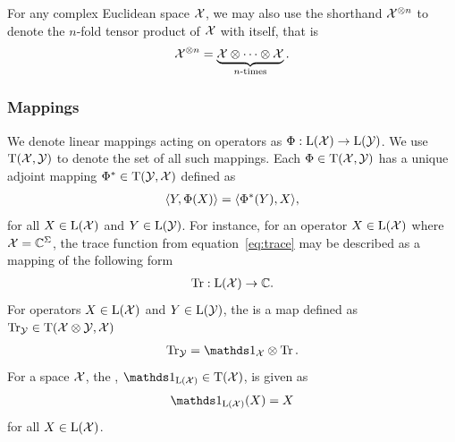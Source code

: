 For any complex Euclidean space $\mathcal{X}$, we may also use the shorthand $\mathcal{X}^{\otimes n}$ to denote the $n$-fold tensor product of $\mathcal{X}$ with itself, that is
\begin{align}
	\mathcal{X}^{\otimes n} = \underbrace{\mathcal{X} \otimes \cdots \otimes \mathcal{X}}_{n\textnormal{-times}}.
\end{align}

\subsubsection*{Mappings}

We denote linear mappings acting on operators as $\Phi : \mathrm{L}(\mathcal{X}) \rightarrow \mathrm{L}(\mathcal{Y})$. We use $\mathrm{T}(\mathcal{X},\mathcal{Y})$ to denote the set of all such mappings. Each $\Phi \in \mathrm{T}(\mathcal{X},\mathcal{Y})$ has a unique adjoint mapping $\Phi^* \in \mathrm{T}(\mathcal{Y},\mathcal{X})$ defined as 
\begin{align}
	\langle Y , \Phi(X)\rangle = \langle \Phi^*(Y) , X\rangle,
\end{align}
for all $X \in \mathrm{L}(\mathcal{X})$ and $Y \in \mathrm{L}(\mathcal{Y})$. For instance, for an operator $X \in \mathrm{L}(\mathcal{X})$ where $\mathcal{X} = \mathbb{C}^{\Sigma}$, the trace function from equation~\eqref{eq:trace} may be described as a mapping of the following form
\begin{align}
	\operatorname{Tr}: \mathrm{L}(\mathcal{X}) \rightarrow \mathbb{C}. 
\end{align}
For operators $X \in \mathrm{L}(\mathcal{X})$ and $Y \in \mathrm{L}(\mathcal{Y})$, the  is a map defined as $\operatorname{Tr}_{\mathcal{Y}} \in \mathrm{T}(\mathcal{X} \otimes \mathcal{Y}, \mathcal{X})$
\begin{align}
 \tr_{\Y} = \I_{\X} \otimes \tr.
\end{align}
For a space $\mathcal{X}$, the , $\I_{\Lin(\X)} \in \Trans(\X)$, is given as 
\begin{align}
	\I_{\Lin(\X)}(X) = X
\end{align}
for all $X \in \mathrm{L}(\mathcal{X})$.

